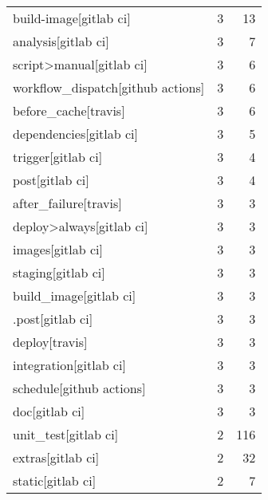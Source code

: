 \begin{tabular}{lrr}
build-image[gitlab ci]                     &                   3 &            13 \\
analysis[gitlab ci]                        &                   3 &             7 \\
script>manual[gitlab ci]                   &                   3 &             6 \\
workflow\_dispatch[github actions]          &                   3 &             6 \\
before\_cache[travis]                       &                   3 &             6 \\
dependencies[gitlab ci]                    &                   3 &             5 \\
trigger[gitlab ci]                         &                   3 &             4 \\
post[gitlab ci]                            &                   3 &             4 \\
after\_failure[travis]                      &                   3 &             3 \\
deploy>always[gitlab ci]                   &                   3 &             3 \\
images[gitlab ci]                          &                   3 &             3 \\
staging[gitlab ci]                         &                   3 &             3 \\
build\_image[gitlab ci]                     &                   3 &             3 \\
.post[gitlab ci]                           &                   3 &             3 \\
deploy[travis]                             &                   3 &             3 \\
integration[gitlab ci]                     &                   3 &             3 \\
schedule[github actions]                   &                   3 &             3 \\
doc[gitlab ci]                             &                   3 &             3 \\
unit\_test[gitlab ci]                       &                   2 &           116 \\
extras[gitlab ci]                          &                   2 &            32 \\
static[gitlab ci]                          &                   2 &             7 \\

\end{tabular}
